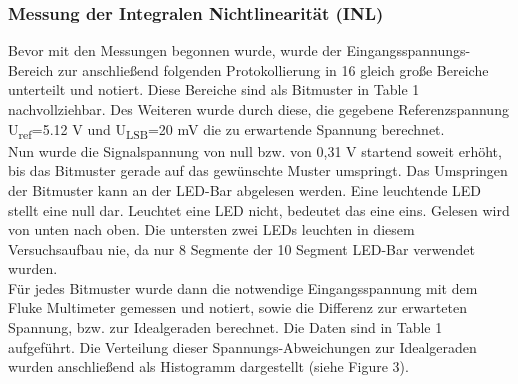 \documentclass[a4paper,12pt]{article}
\begin{document}
\subsubsection*{Messung der Integralen Nichtlinearität (INL)}
Bevor mit den Messungen begonnen wurde, wurde der Eingangsspannungs-Bereich zur anschließend folgenden Protokollierung in 16 gleich große Bereiche unterteilt und notiert. Diese Bereiche sind als Bitmuster in Table 1 nachvollziehbar. Des Weiteren wurde durch diese, die gegebene Referenzspannung U\textsubscript{ref}=5.12 V und U\textsubscript{LSB}=20 mV die zu erwartende Spannung berechnet.\\
Nun wurde die Signalspannung von null bzw. von 0,31 V startend soweit erhöht, bis das Bitmuster gerade auf das gewünschte Muster umspringt. Das Umspringen der Bitmuster kann an der LED-Bar abgelesen werden. Eine leuchtende LED stellt eine null dar. Leuchtet eine LED nicht, bedeutet das eine eins. Gelesen wird von unten nach oben. Die untersten zwei LEDs leuchten in diesem Versuchsaufbau nie, da nur 8 Segmente der 10 Segment LED-Bar verwendet wurden.\\
Für jedes Bitmuster wurde dann die notwendige Eingangsspannung mit dem Fluke Multimeter gemessen und notiert, sowie die Differenz zur erwarteten Spannung, bzw. zur Idealgeraden berechnet. Die Daten sind in Table 1 aufgeführt. Die Verteilung dieser Spannungs-Abweichungen zur Idealgeraden wurden anschließend als Histogramm dargestellt (siehe Figure 3).\\



\setlength{\tabcolsep}{14pt}
\end{document}
